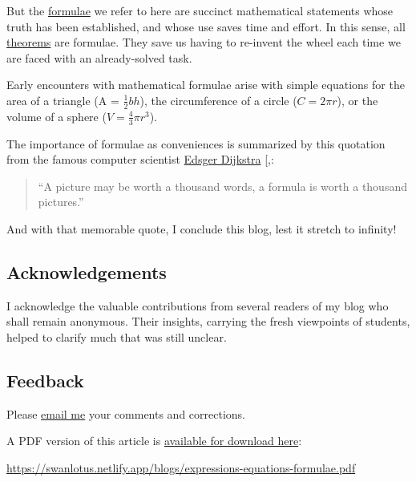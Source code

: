 \documentclass[
  a4paper,
]{article}
\begin{document}
But the \href{https://en.wikipedia.org/wiki/Formula}{formulae} we refer
to here are succinct mathematical statements whose truth has been
established, and whose use saves time and effort. In this sense, all
\href{https://en.wikipedia.org/wiki/Formula}{theorems} are formulae.
They save us having to re-invent the wheel each time we are faced with
an already-solved task.

Early encounters with mathematical formulae arise with simple equations
for the area of a triangle (A = \(\frac{1}{2}bh\)), the circumference of
a circle (\(C = 2\pi r\)), or the volume of a sphere
(\(V = \frac{4}{3}\pi r^3\)).

The importance of formulae as conveniences is summarized by this
quotation from the famous computer scientist
\href{https://en.wikipedia.org/wiki/Edsger_W._Dijkstra}{Edsger Dijkstra}
{[},\citeproc{ref-dijkstra-html}{6}{]}:

\begin{quote}
``A picture may be worth a thousand words, a formula is worth a thousand
pictures.''
\end{quote}

And with that memorable quote, I conclude this blog, lest it stretch to
infinity!

\subsection{Acknowledgements}\label{acknowledgements}

I acknowledge the valuable contributions from several readers of my blog
who shall remain anonymous. Their insights, carrying the fresh
viewpoints of students, helped to clarify much that was still unclear.

\subsection{Feedback}\label{feedback}

Please \href{mailto:feedback.swanlotus@gmail.com}{email me} your
comments and corrections.

\noindent A PDF version of this article is
\href{./expressions-equations-formulae.pdf}{available for download
here}:

\begin{small}

\begin{sffamily}

\url{https://swanlotus.netlify.app/blogs/expressions-equations-formulae.pdf}

\end{sffamily}

\end{small}
\end{document}
